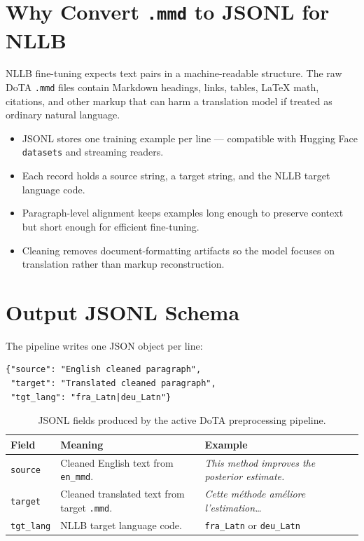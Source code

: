 \documentclass[12pt,a4paper]{article}
\begin{document}
\section{Why Convert \texttt{.mmd} to JSONL for NLLB}

NLLB fine-tuning expects text pairs in a machine-readable structure. The raw DoTA \texttt{.mmd} files contain Markdown headings, links, tables, LaTeX math, citations, and other markup that can harm a translation model if treated as ordinary natural language.

\begin{itemize}
  \item JSONL stores one training example per line — compatible with Hugging Face \texttt{datasets} and streaming readers.
  \item Each record holds a source string, a target string, and the NLLB target language code.
  \item Paragraph-level alignment keeps examples long enough to preserve context but short enough for efficient fine-tuning.
  \item Cleaning removes document-formatting artifacts so the model focuses on translation rather than markup reconstruction.
\end{itemize}

\section{Output JSONL Schema}

The pipeline writes one JSON object per line:

\begin{lstlisting}[language=JSONL, caption={JSONL record format.}]
{"source": "English cleaned paragraph",
 "target": "Translated cleaned paragraph",
 "tgt_lang": "fra_Latn|deu_Latn"}
\end{lstlisting}

\begin{table}[H]
\centering
\caption{JSONL fields produced by the active DoTA preprocessing pipeline.}
\label{tab:jsonl-schema}
\renewcommand{\arraystretch}{1.25}
\begin{tabularx}{\linewidth}{llX}
\toprule
\textbf{Field} & \textbf{Meaning} & \textbf{Example} \\
\midrule
\texttt{source}   & Cleaned English text from \texttt{en\_mmd}. & \textit{This method improves the posterior estimate.} \\
\texttt{target}   & Cleaned translated text from target \texttt{.mmd}. & \textit{Cette méthode améliore l'estimation\ldots} \\
\texttt{tgt\_lang} & NLLB target language code. & \texttt{fra\_Latn} or \texttt{deu\_Latn} \\
\bottomrule
\end{tabularx}
\end{table}
\end{document}

